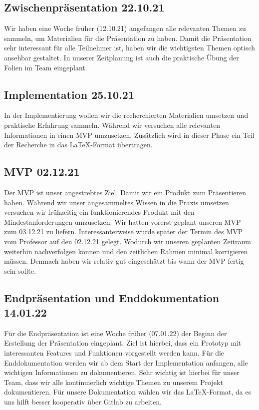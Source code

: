 \subsection{Zwischenpräsentation 22.10.21}
Wir haben eine Woche früher (12.10.21) angefangen alle relevanten Themen zu sammeln, um Materialien für die Präsentation zu haben.
Damit die Präsentation sehr interessant für alle Teilnehmer ist, haben wir die wichtigsten Themen optisch ansehbar gestaltet.
In unserer Zeitplanung ist auch die praktische Übung der Folien im Team eingeplant.

\subsection{Implementation 25.10.21}
In der Implementierung wollen wir die recherchierten Materialien umsetzen und praktische Erfahrung sammeln.
Während wir versuchen alle relevanten Informationen in einen MVP umzusetzen. Zusätzlich wird in dieser Phase
ein Teil der Recherche in das \LaTeX-Format übertragen.

\subsection{MVP 02.12.21}
Der MVP ist unser angestrebtes Ziel. Damit wir ein Produkt zum Präsentieren haben.
Während wir unser angesammeltes Wissen in die Praxis umsetzen versuchen wir
frühzeitig ein funktionierendes Produkt mit den Mindestanforderungen umzusetzen.
Wir hatten vorerst geplant unseren MVP zum 03.12.21 zu liefern.
Interessanterweise wurde später der Termin des MVP vom Professor auf den 02.12.21 gelegt.
Wodurch wir unseren geplanten Zeitraum weiterhin nachverfolgen können und
den zeitlichen Rahmen minimal korrigieren müssen. 
Demnach haben wir relativ gut eingeschätzt bis wann der MVP fertig sein sollte.

\subsection{Endpräsentation und Enddokumentation 14.01.22}
Für die Endpräsentation ist eine Woche früher (07.01.22) der Beginn der Erstellung der Präsentation eingeplant.
Ziel ist hierbei, dass ein Prototyp mit interessanten Features und Funktionen vorgestellt werden kann.
Für die Enddokumentation werden wir ab dem Start der Implementation anfangen, alle wichtigen Informationen zu dokumentieren.
Sehr wichtig ist hierbei für unser Team, dass wir alle kontinuierlich wichtige Themen zu unserem Projekt dokumentieren.
Für unsere Dokumentation wählen wir das \LaTeX-Format, da es uns hilft besser kooperativ über Gitlab zu arbeiten.
